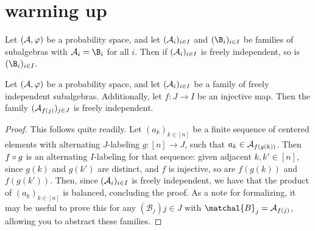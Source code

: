 \chapter{warming up}

\begin{lemma}
  \label{lem:freeIndep_congr}
  Let \((\mathcal{A},\varphi)\) be a probability space, and let \((\mathcal{A}_i)_{i\in I}\) and \((\B_i)_{i\in I}\) be
  families of subalgebras with \(\A_i = \B_i\) for all \(i\). Then if \((\mathcal{A}_i)_{i \in I}\) is freely
  independent, so is \((\B_i)_{i\in I}\).
\end{lemma}

\begin{lemma}
  \label{lem:freeIndep_of_inj}
  Let \((\mathcal{A},\varphi)\) be a probability space, and let \((\mathcal{A}_i)_{i\in I}\) be a family of
  freely independent subalgebras. Additionally, let \(f:J \rightarrow I\) be an injective map. Then the family
  \((\mathcal{A}_{f(j)})_{j\in J}\) is freely independent.
\end{lemma}
\begin{proof}
  This follows quite readily. Let \((a_k)_{k\in [n]}\) be a finite sequence of centered elements
  with alternating \(J\)-labeling \(g:[n]\rightarrow J\), such that \(a_k \in \mathcal{A}_{f(g(k))}\).
  Then \(f \circ g\) is an alternating \(I\)-labeling for that sequence: given adjacent \(k,k' \in [n]\),
  since \(g(k)\) and \(g(k')\) are distinct, and \(f\) is injective, so are \(f(g(k))\) and \(f(g(k'))\).
  Then, since \((\mathcal{A}_i)_{i\in I}\) is freely independent, we have that the product of \((a_k)_{k\in [n]}\)
  is balanced, concluding the proof. As a note for formalizing, it may be useful to prove this
  for any \((\mathcal{B}_j){j\in J}\) with \(\matchal{B}_j = \A_{f(j)}\), allowing you to abstract these families.
\end{proof}
